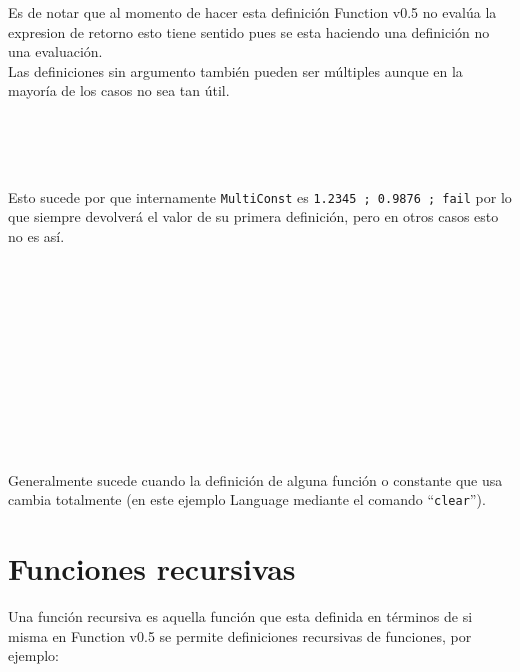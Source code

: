       Es de notar que al momento de hacer esta definición Function v0.5 no evalúa la expresion de retorno esto tiene sentido pues se esta haciendo una definición no una evaluación.
      \\
      
      Las definiciones sin argumento también pueden ser múltiples aunque en la mayoría de los casos no sea tan útil.
      
      \begin{fxcode}
         \\
         \\
         \\
      \end{fxcode}
      
      Esto sucede por que internamente \texttt{MultiConst} es \texttt{1.2345 ; 0.9876 ; fail} por lo que siempre devolverá el valor de su primera definición, pero en otros casos esto no es así.
      
      \begin{fxcode}
         \\
         \\
         \\
         \\
         \\
         \\
         \\
         \\
         \\
         \\
      \end{fxcode}
      
      Generalmente sucede cuando la definición de alguna función o constante que usa cambia totalmente (en este ejemplo Language mediante el comando ``\texttt{clear}'').
      
   \section{Funciones recursivas}
      Una función recursiva es aquella función que esta definida en términos de si misma en Function v0.5 se permite definiciones recursivas de funciones, por ejemplo:
      
